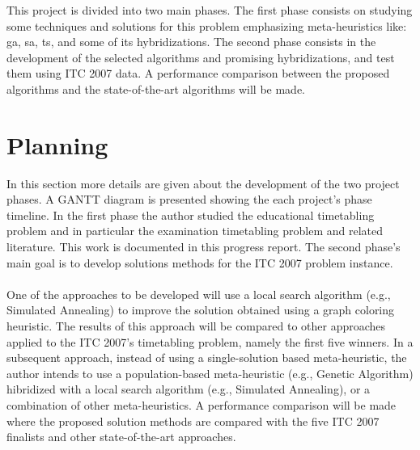 This project is divided into two main phases. The first phase consists on studying some techniques and solutions for this problem emphasizing meta-heuristics like: \gls{ga}, \gls{sa}, \gls{ts}, and some of its hybridizations. The second phase consists in the development of the selected algorithms and promising hybridizations, and test them using ITC 2007 data. A performance comparison between the proposed algorithms and the state-of-the-art algorithms will be made.


\section{Planning}

In this section more details are given about the development of the two project phases. A GANTT diagram is presented showing the each project's phase timeline. In the first phase the author studied the educational timetabling problem and in particular the examination timetabling problem and related literature. This work is documented in this progress report. The second phase's main goal is to develop solutions methods for the ITC 2007 problem instance. \\
\\
One of the approaches to be developed will use a local search algorithm (e.g., Simulated Annealing) to improve the solution obtained using a graph coloring heuristic. The results of this approach will be compared to other approaches applied to the ITC 2007’s timetabling problem, namely the first five winners. In a subsequent approach, instead of using a single-solution based meta-heuristic, the author intends to use a population-based meta-heuristic (e.g., Genetic Algorithm) hibridized with a local
search algorithm (e.g., Simulated Annealing), or a combination of other meta-heuristics. A performance comparison will be made where the proposed solution methods are compared with the five ITC 2007 finalists and other state-of-the-art approaches. 

